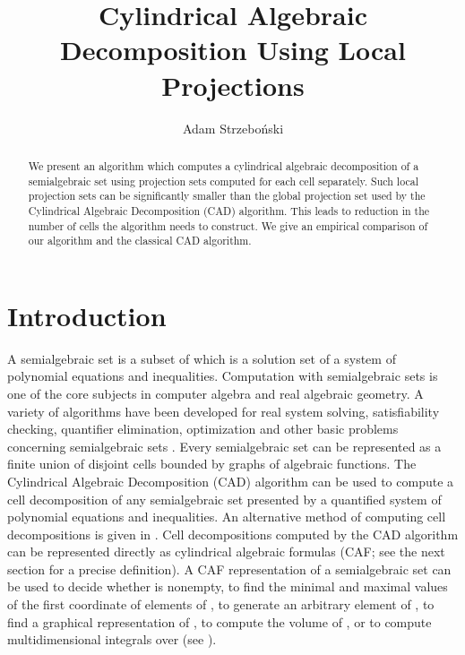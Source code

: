 \documentclass[english]{amsart}
\numberwithin{equation}{section}
\numberwithin{figure}{section}
\begin{document}
\title{Cylindrical Algebraic Decomposition Using Local Projections}

\author{Adam Strzebo\'nski}

\address{Wolfram Research Inc., 100 Trade Centre Drive, Champaign, IL 61820,
U.S.A. }



\maketitle

\begin{abstract}
We present an algorithm which computes a cylindrical algebraic decomposition
of a semialgebraic set using projection sets computed for each cell
separately. Such local projection sets can be significantly smaller
than the global projection set used by the Cylindrical Algebraic Decomposition
(CAD) algorithm. This leads to reduction in the number of cells the
algorithm needs to construct. We give an empirical comparison of our
algorithm and the classical CAD algorithm.
\end{abstract}

\section{Introduction}

A semialgebraic set is a subset of  which is a solution
set of a system of polynomial equations and inequalities. Computation
with semialgebraic sets is one of the core subjects in computer algebra
and real algebraic geometry. A variety of algorithms have been developed
for real system solving, satisfiability checking, quantifier elimination,
optimization and other basic problems concerning semialgebraic sets
\cite{C,BPR,CJ,CMXY,DSW,GV,HS,LW,R,T,W1}. Every semialgebraic set
can be represented as a finite union of disjoint cells bounded by
graphs of algebraic functions. The Cylindrical Algebraic Decomposition
(CAD) algorithm \cite{C,CJ,S7} can be used to compute a cell decomposition
of any semialgebraic set presented by a quantified system of polynomial
equations and inequalities. An alternative method of computing cell
decompositions is given in \cite{CMXY}. Cell decompositions computed
by the CAD algorithm can be represented directly \cite{S7,S8,B2}
as cylindrical algebraic formulas (CAF; see the next section for a
precise definition). A CAF representation of a semialgebraic set 
can be used to decide whether  is nonempty, to find the minimal
and maximal values of the first coordinate of elements of , to
generate an arbitrary element of , to find a graphical representation
of , to compute the volume of , or to compute multidimensional
integrals over  (see \cite{S4}). 
\end{document}

